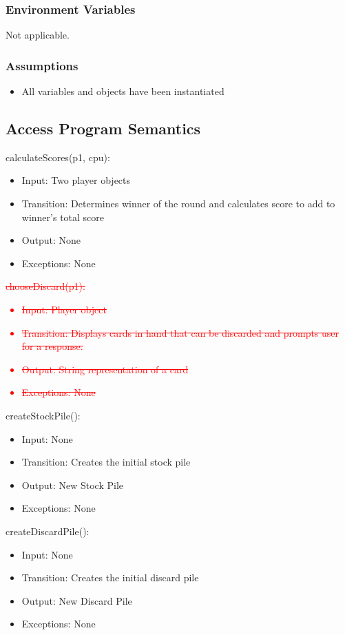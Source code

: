 \documentclass[12pt, titlepage]{article}
\begin{document}
\subsubsection{Environment Variables}
Not applicable.

\subsubsection{Assumptions}
\begin{itemize}
    \item All variables and objects have been instantiated
\end{itemize}

\subsection{Access Program Semantics}
\noindent calculateScores(p1, cpu):
\begin{itemize}
    \item Input: Two player objects
    \item Transition: Determines winner of the round and calculates score to add to winner's total score
    \item Output: None
    \item Exceptions: None
\end{itemize}

\noindent \textcolor{red}{\sout{chooseDiscard(p1):}
\begin{itemize}
    \item \sout{Input: Player object}
    \item \sout{Transition: Displays cards in hand that can be discarded and prompts user for a response.}
    \item \sout{Output: String representation of a card}
    \item \sout{Exceptions: None}
\end{itemize}
}

\noindent createStockPile():
\begin{itemize}
    \item Input: None
    \item Transition: Creates the initial stock pile
    \item Output: New Stock Pile
    \item Exceptions: None
\end{itemize}

\noindent createDiscardPile():
\begin{itemize}
    \item Input: None
    \item Transition: Creates the initial discard pile
    \item Output: New Discard Pile
    \item Exceptions: None
\end{itemize}
\end{document}

